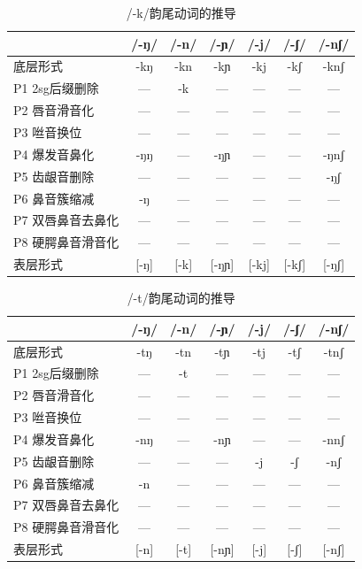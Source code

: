 \begin{table}[H]
\vspace{5pt}
    \centering
    \caption{/-k/韵尾动词的推导}
    \label{deriv-k}
\setlength{\tabcolsep}{4pt}\small
\begin{tabular}{l|cccccc}
\toprule
            & /-ŋ/ & /-n/ & /-ɲ/ & /-j/ & /-ʃ/ & /-nʃ/ \\
\midrule
底层形式 & -kŋ & -kn & -kɲ & -kj & -kʃ & -knʃ \\
P1 2sg后缀删除 & --- & -k & --- & --- & --- & --- \\
P2 唇音滑音化 & --- & --- & --- & --- & --- & --- \\
P3 咝音换位 & --- & --- & --- & --- & --- & --- \\
P4 爆发音鼻化 & -ŋŋ & --- & -ŋɲ & --- & --- & -ŋnʃ \\
P5 齿龈音删除 & --- & --- & --- & --- & --- & -ŋʃ \\
P6 鼻音簇缩减 & -ŋ & --- & --- & --- & --- & --- \\
P7 双唇鼻音去鼻化 & --- & --- & --- & --- & --- & --- \\
P8 硬腭鼻音滑音化 & --- & --- & --- & --- & --- & --- \\
\midrule
表层形式 & [-ŋ] & [-k] & [-ŋɲ] & [-kj] & [-kʃ] & [-ŋʃ] \\
\bottomrule
\end{tabular}
\end{table}

\begin{table}[H]
\vspace{5pt}
    \centering
    \caption{/-t/韵尾动词的推导}
    \label{deriv-t}
\setlength{\tabcolsep}{4pt}\small
\begin{tabular}{l|cccccc}
\toprule
            & /-ŋ/ & /-n/ & /-ɲ/ & /-j/ & /-ʃ/ & /-nʃ/ \\
\midrule
底层形式 & -tŋ & -tn & -tɲ & -tj & -tʃ & -tnʃ \\
P1 2sg后缀删除 & --- & -t & --- & --- & --- & --- \\
P2 唇音滑音化 & --- & --- & --- & --- & --- & --- \\
P3 咝音换位 & --- & --- & --- & --- & --- & --- \\
P4 爆发音鼻化 & -nŋ & --- & -nɲ & --- & --- & -nnʃ \\
P5 齿龈音删除 & --- & --- & --- & -j & -ʃ & -nʃ \\
P6 鼻音簇缩减 & -n & --- & --- & --- & --- & --- \\
P7 双唇鼻音去鼻化 & --- & --- & --- & --- & --- & --- \\
P8 硬腭鼻音滑音化 & --- & --- & --- & --- & --- & --- \\
\midrule
表层形式 & [-n] & [-t] & [-nɲ] & [-j] & [-ʃ] & [-nʃ] \\
\bottomrule
\end{tabular}
\end{table}

